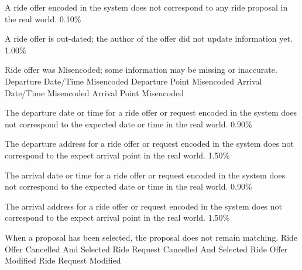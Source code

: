   \startkaosspec
  	 {A ride offer encoded in the system does not correspond to any ride proposal in the real world.}
  	 {0.10\%}
  \stopkaosspec

  \startkaosspec
  	 {A ride offer is out-dated; the author of the offer did not update information yet.}
  	 {1.00\%}
  \stopkaosspec

  \startkaosspec
  	 {Ride offer was Misencoded; some information may be missing or inaccurate.}
  	 {Departure Date/Time Misencoded}
  	 {Departure Point Misencoded}
  	 {Arrival Date/Time Misencoded}
  	 {Arrival Point Misencoded}
  \stopkaosspec

  \startkaosspec
  	 {The departure date or time for a ride offer or request encoded in the system does not correspond to the expected date or time in the real world.}
  	 {0.90\%}
  \stopkaosspec

  \startkaosspec
  	 {The departure address for a ride offer or request encoded in the system does not correspond to the expect arrival point in the real world.}
  	 {1.50\%}
  \stopkaosspec

  \startkaosspec
  	 {The arrival date or time for a ride offer or request encoded in the system does not correspond to the expected date or time in the real world.}
  	 {0.90\%}
  \stopkaosspec

  \startkaosspec
  	 {The arrival address for a ride offer or request encoded in the system does not correspond to the expect arrival point in the real world.}
  	 {1.50\%}
  \stopkaosspec
    

    {}
    
  \startkaosspec
     {When a proposal has been selected, the proposal does not remain matching.}
     {Ride Offer Cancelled And Selected}
     {Ride Request Cancelled And Selected}
     {Ride Offer Modified}
     {Ride Request Modified}
  \stopkaosspec


